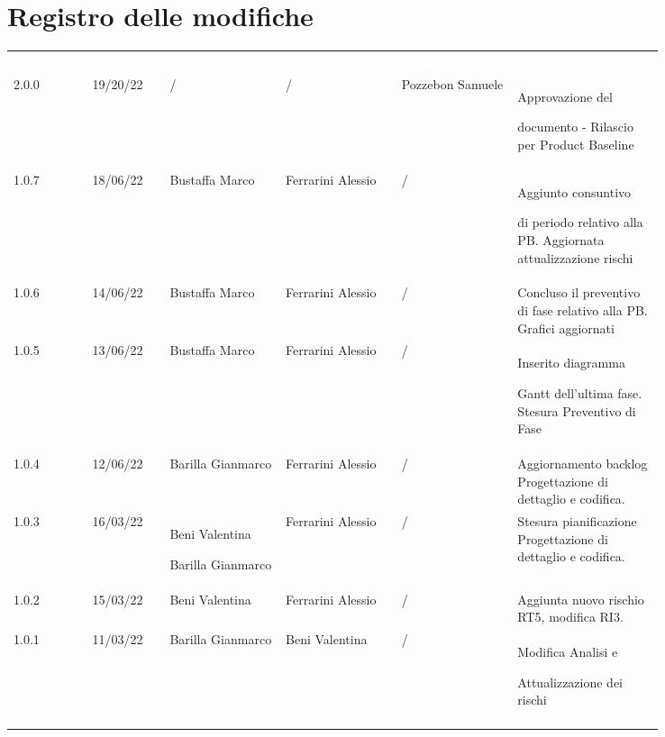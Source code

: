 \section*{Registro delle modifiche}

{\renewcommand{\arraystretch}{1.5}
\scriptsize
\begin{tabular}{p{0.10\linewidth}p{0.10\linewidth}p{0.15\linewidth}p{0.15\linewidth}p{0.15\linewidth}p{0.19\linewidth}}
	\rowcolor[RGB]{33, 73, 50}
	\textcolor{white}{\textbf{Versione}} & \textcolor{white}{\textbf{Data}} &
	\textcolor{white}{\textbf{Redattore}} & \textcolor{white}{\textbf{Verificatore}} &
	\textcolor{white}{\textbf{Approvatore}} & \textcolor{white}{\textbf{Descrizione}}\\

	\rowcolor[RGB]{233, 245, 206}
	2.0.0 & 19/20/22 & / & / & Pozzebon Samuele & Approvazione del \par documento - Rilascio per Product Baseline\\
	\rowcolor[RGB]{216, 235, 171}
	1.0.7 & 18/06/22 & Bustaffa Marco & Ferrarini Alessio & / & Aggiunto consuntivo \par di periodo relativo alla PB. Aggiornata attualizzazione rischi\\
	\rowcolor[RGB]{233, 245, 206}
	1.0.6 & 14/06/22 & Bustaffa Marco & Ferrarini Alessio & / & Concluso il preventivo di fase relativo alla PB. Grafici aggiornati\\
	\rowcolor[RGB]{216, 235, 171}
	1.0.5 & 13/06/22 & Bustaffa Marco & Ferrarini Alessio & / & Inserito diagramma \par Gantt dell'ultima fase. Stesura Preventivo di Fase\\
	\rowcolor[RGB]{233, 245, 206}
	1.0.4 & 12/06/22 & Barilla Gianmarco & Ferrarini Alessio & / & Aggiornamento backlog Progettazione di dettaglio e codifica.\\
	\rowcolor[RGB]{216, 235, 171}
	1.0.3 & 16/03/22 & Beni Valentina \par Barilla Gianmarco & Ferrarini Alessio & / & Stesura pianificazione Progettazione di dettaglio e codifica.\\
	\rowcolor[RGB]{233, 245, 206}
	1.0.2 & 15/03/22 & Beni Valentina & Ferrarini Alessio & / & Aggiunta nuovo rischio RT5, modifica RI3.\\
	\rowcolor[RGB]{216, 235, 171}
	1.0.1 & 11/03/22 & Barilla Gianmarco& Beni Valentina & / & Modifica Analisi e\par Attualizzazione dei rischi\\
	\rowcolor[RGB]{233, 245, 206}

\end{tabular}}
